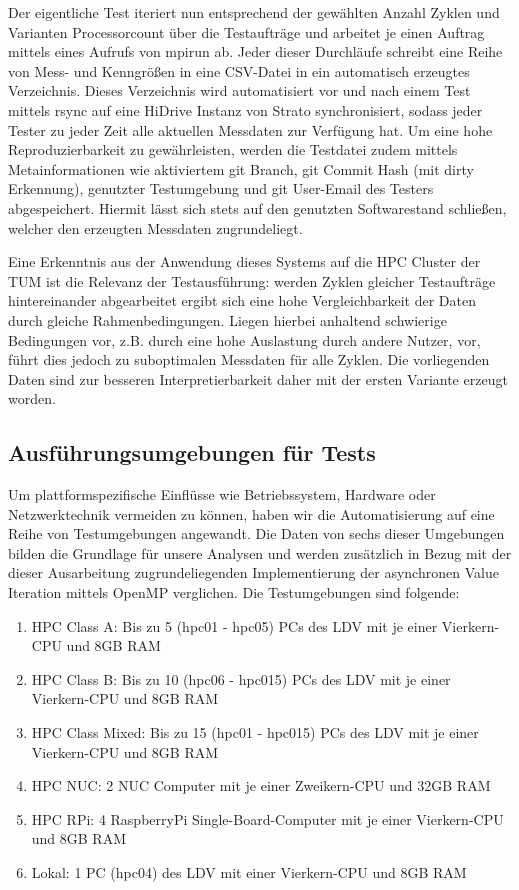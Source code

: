 Der eigentliche Test iteriert nun entsprechend der gewählten Anzahl Zyklen und Varianten Processorcount über die Testaufträge und arbeitet je einen Auftrag mittels eines Aufrufs von mpirun ab. Jeder dieser Durchläufe schreibt eine Reihe von Mess- und Kenngrößen in eine CSV-Datei in ein automatisch erzeugtes Verzeichnis. Dieses Verzeichnis wird automatisiert vor und nach einem Test mittels rsync auf eine HiDrive Instanz von Strato synchronisiert, sodass jeder Tester zu jeder Zeit alle aktuellen Messdaten zur Verfügung hat. Um eine hohe Reproduzierbarkeit zu gewährleisten, werden die Testdatei zudem mittels Metainformationen wie aktiviertem git Branch, git Commit Hash (mit dirty Erkennung), genutzter Testumgebung und git User-Email des Testers abgespeichert. Hiermit lässt sich stets auf den genutzten Softwarestand schließen, welcher den erzeugten Messdaten zugrundeliegt.

Eine Erkenntnis aus der Anwendung dieses Systems auf die HPC Cluster der TUM ist die Relevanz der Testausführung: werden Zyklen gleicher Testaufträge hintereinander abgearbeitet ergibt sich eine hohe Vergleichbarkeit der Daten durch gleiche Rahmenbedingungen. Liegen hierbei anhaltend schwierige Bedingungen vor, z.B. durch eine hohe Auslastung durch andere Nutzer, vor, führt dies jedoch zu suboptimalen Messdaten für alle Zyklen. Die vorliegenden Daten sind zur besseren Interpretierbarkeit daher mit der ersten Variante erzeugt worden.

\subsection{Ausführungsumgebungen für Tests}
\label{ssec:ausfuehrungsumgebungen}
Um plattformspezifische Einflüsse wie Betriebssystem, Hardware oder Netzwerktechnik vermeiden zu können, haben wir die Automatisierung auf eine Reihe von Testumgebungen angewandt. Die Daten von sechs dieser Umgebungen bilden die Grundlage für unsere Analysen und werden zusätzlich in Bezug mit der dieser Ausarbeitung zugrundeliegenden Implementierung der asynchronen Value Iteration mittels OpenMP verglichen. Die Testumgebungen sind folgende:

\begin{enumerate}
    \item HPC Class A: Bis zu 5 (hpc01 - hpc05) PCs des LDV mit je einer Vierkern-CPU und 8GB RAM
    \item HPC Class B: Bis zu 10 (hpc06 - hpc015) PCs des LDV mit je einer Vierkern-CPU und 8GB RAM
    \item HPC Class Mixed: Bis zu 15 (hpc01 - hpc015) PCs des LDV mit je einer Vierkern-CPU und 8GB RAM
    \item HPC NUC: 2 NUC Computer mit je einer Zweikern-CPU und 32GB RAM
    \item HPC RPi: 4 RaspberryPi Single-Board-Computer mit je einer Vierkern-CPU und 8GB RAM
    \item Lokal: 1 PC (hpc04) des LDV mit einer Vierkern-CPU und 8GB RAM
\end{enumerate}

